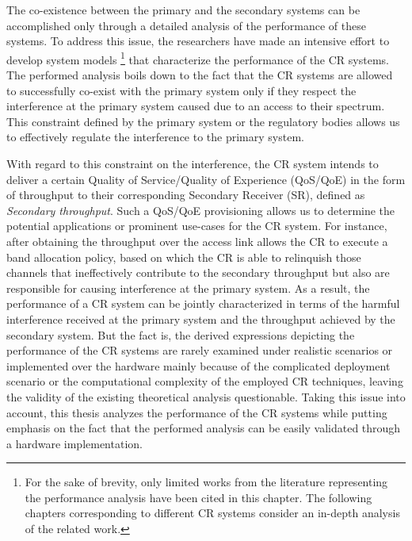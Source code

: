 The co-existence between the primary and the secondary systems can be accomplished only through a detailed analysis of the performance of these systems. %
To address this issue, the researchers have made an intensive effort to develop system models \cite{Liang08, Kang209, Kang09}\footnote{For the sake of brevity, only limited works from the literature representing the performance analysis have been cited in this chapter. The following chapters corresponding to different CR systems consider an in-depth analysis of the related work.} that characterize the performance of the CR systems. The performed analysis boils down to the fact that the CR systems are allowed to successfully co-exist with the primary system only if they respect the interference at the primary system caused due to an access to their spectrum. This constraint defined by the primary system or the regulatory bodies allows us to effectively regulate the interference to the primary system. 

With regard to this constraint on the interference, the CR system intends to deliver a certain Quality of Service/Quality of Experience (QoS/QoE) in the form of throughput to their corresponding Secondary Receiver (SR), defined as \textit{Secondary throughput}. Such a QoS/QoE provisioning allows us to determine the potential applications or prominent use-cases for the CR system. For instance, after obtaining the throughput over the access link allows the CR to execute a band allocation policy, based on which the CR is able to relinquish those channels that ineffectively contribute to the secondary throughput but also are responsible for causing interference at the primary system. As a result, the performance of a CR system can be jointly characterized in terms of the harmful interference received at the primary system and the throughput achieved by the secondary system. 
But the fact is, the derived expressions depicting the performance of the CR systems are rarely examined under realistic scenarios or implemented over the hardware mainly because of the complicated deployment scenario or the computational complexity of the employed CR techniques, leaving the validity of the existing theoretical analysis questionable. Taking this issue into account, this thesis analyzes the performance of the CR systems while putting emphasis on the fact that the performed analysis can be easily validated through a hardware implementation. 

